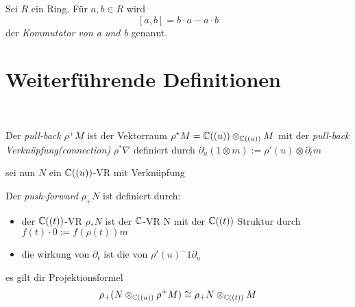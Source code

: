 \begin{defn}[Kommutator]%
  Sei $R$ ein Ring. Für $a,b\in R$ wird
  \[[a,b]=b\cdot a-a\cdot b\]
  der \emph{Kommutator von a und b} genannt.
\end{defn}

\section{Weiterführende Definitionen}~

\begin{defn}
  Der \emph{pull-back} $\rho^{+}M$ ist der Vektorraum
  $\rho^{*}M={\mathbb C}((u))\otimes_{{\mathbb C}((u))}M$ mit
  der \emph{pull-back Verknüpfung(connection)} $\rho^*\nabla$ definiert durch
  $\partial_u(1\otimes m):=\rho'(u)\otimes\partial_tm$
\end{defn}

sei nun $N$ ein ${\mathbb C}((u))$-VR mit Verknüpfung
\begin{defn}
  Der \emph{push-forward} $\rho_+N$ ist definiert durch:
  \begin{itemize}
    \item der ${\mathbb C}((t))$-VR $\rho_*N$ ist der ${\mathbb C}$-VR N mit der ${\mathbb C}((t))$
      Struktur durch $f(t)\cdot 0:=f(\rho(t))m$
    \item die wirkung von $\partial_t$ ist die von $\rho'(u)^-1\partial_u$
  \end{itemize}
\end{defn}
\begin{thm} \label{thm:Projektionsformel}
  es gilt dir Projektionsformel
  \begin{equation} \label{eq:Projektionsformel}
    \rho_+(N\otimes_{{\mathbb C}((u))}\rho^+M)\cong\rho_+N\otimes_{{\mathbb C}((t))}M
  \end{equation}
\end{thm}

\begin{comment}
  TEST für ref\\
  \ref{thm:Projektionsformel}\\
  TEST für eqref\\
  \eqref{eq:Projektionsformel}\\
\end{comment}

